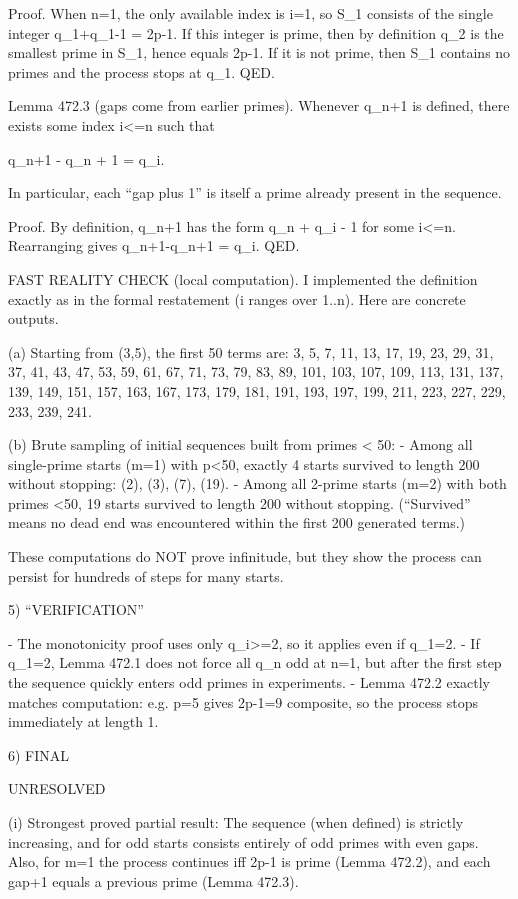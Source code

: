 Proof.
When n=1, the only available index is i=1, so S_1 consists of the single integer q_1+q_1-1 = 2p-1. If this integer is prime, then by definition q_2 is the smallest prime in S_1, hence equals 2p-1. If it is not prime, then S_1 contains no primes and the process stops at q_1.  QED.

Lemma 472.3 (gaps come from earlier primes).
Whenever q_{n+1} is defined, there exists some index i<=n such that

    q_{n+1} - q_n + 1 = q_i.

In particular, each “gap plus 1” is itself a prime already present in the sequence.

Proof.
By definition, q_{n+1} has the form q_n + q_i - 1 for some i<=n. Rearranging gives q_{n+1}-q_n+1 = q_i.  QED.

FAST REALITY CHECK (local computation).
I implemented the definition exactly as in the formal restatement (i ranges over 1..n). Here are concrete outputs.

(a) Starting from (3,5), the first 50 terms are:
3, 5, 7, 11, 13, 17, 19, 23, 29, 31, 37, 41, 43, 47, 53, 59, 61, 67, 71, 73, 79, 83, 89, 101, 103, 107, 109, 113, 131, 137, 139, 149, 151, 157, 163, 167, 173, 179, 181, 191, 193, 197, 199, 211, 223, 227, 229, 233, 239, 241.

(b) Brute sampling of initial sequences built from primes < 50:
- Among all single-prime starts (m=1) with p<50, exactly 4 starts survived to length 200 without stopping: (2), (3), (7), (19).
- Among all 2-prime starts (m=2) with both primes <50, 19 starts survived to length 200 without stopping.
(“Survived” means no dead end was encountered within the first 200 generated terms.)

These computations do NOT prove infinitude, but they show the process can persist for hundreds of steps for many starts.

5) “VERIFICATION”

- The monotonicity proof uses only q_i>=2, so it applies even if q_1=2.
- If q_1=2, Lemma 472.1 does not force all q_n odd at n=1, but after the first step the sequence quickly enters odd primes in experiments.
- Lemma 472.2 exactly matches computation: e.g. p=5 gives 2p-1=9 composite, so the process stops immediately at length 1.

6) FINAL

UNRESOLVED

(i) Strongest proved partial result:
The sequence (when defined) is strictly increasing, and for odd starts consists entirely of odd primes with even gaps. Also, for m=1 the process continues iff 2p-1 is prime (Lemma 472.2), and each gap+1 equals a previous prime (Lemma 472.3).

